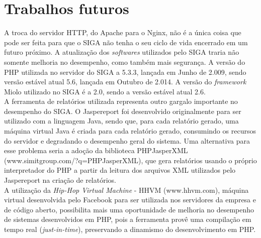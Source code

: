 \section{Trabalhos futuros}
A troca do servidor HTTP, do Apache para o Nginx, não é a única coisa que pode 
ser feita para que o SIGA não tenha o seu ciclo de vida encerrado em um futuro 
próximo. A atualização dos \textit{softwares} utilizados pelo SIGA traria não 
somente melhoria no desempenho, como também mais segurança. A versão do PHP 
utilizada no servidor do SIGA a 5.3.3, lançada em Junho de 2.009, sendo versão 
estável atual 5.6, lançada em Outubro de 2.014. A versão do 
\textit{framework} Miolo utilizado no SIGA é a 2.0, sendo a versão estável 
atual 2.6.\\
A ferramenta de relatórios utilizada representa outro gargalo importante no 
desempenho do SIGA. O Jaspereport foi desenvolvido originalmente para ser 
utilizado com a linguagem Java, sendo que, para cada relatório gerado, uma 
máquina virtual Java é criada para cada relatório gerado, consumindo os 
recursos do servidor e degradando o desempenho geral do sistema. Uma 
alternativa para esse problema seria a adoção da biblioteca PHPJasperXML 
(www.simitgroup.com/?q=PHPJasperXML), que gera relatórios usando o próprio 
interpretador do PHP a partir da leitura dos arquivos XML utilizados 
pelo Jaspereport na criação de relatórios.\\
A utilização da \textit{Hip-Hop Virtual Machine} - HHVM (www.hhvm.com), máquina 
virtual desenvolvida pelo Facebook para ser utilizada nos servidores da empresa 
e de código aberto, possibilita mais uma oportunidade de melhoria no desempenho 
de sistemas desenvolvidos em PHP, pois a ferramenta provê uma compilação em 
tempo real (\textit{just-in-time}), preservando a dinamismo do desenvolvimento 
em PHP.
